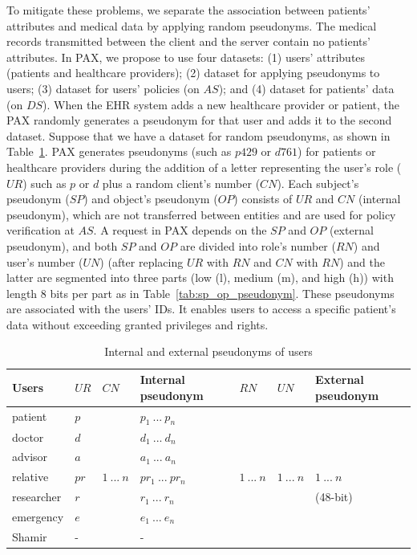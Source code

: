 \documentclass[journal,article,submit,moreauthors,pdftex]{Definitions/mdpi}
\begin{document}
\begin{itemize}
To mitigate these problems, we separate the association between patients' attributes and medical
data by applying random pseudonyms. The medical records transmitted between the client and the
server contain no patients' attributes. In PAX, we propose to use four datasets: (1) users' attributes (patients and healthcare providers); (2) dataset for applying pseudonyms to users;
(3) dataset for users' policies (on $AS$); and (4) dataset for patients' data (on $DS$).
When the EHR system adds a new healthcare provider or patient, the PAX randomly generates a
pseudonym for that user and adds it to the second dataset.
Suppose that we have a dataset for random pseudonyms, as shown in Table~\ref{tab:r_rn_un_pseudonym}. PAX generates pseudonyms (such as $p429$ or $d761$) for patients or healthcare providers
during the addition of a letter representing the user's role ($UR$) such as $p$ or $d$ plus a
random client's number ($CN$). Each subject's pseudonym ($SP$) and object's pseudonym ($OP$)
consists of $UR$ and $CN$ (internal pseudonym), which are not transferred between entities
and are used for policy verification at $AS$. A request in PAX depends on the $SP$ and $OP$
(external pseudonym), and both $SP$ and $OP$ are divided into role's number ($RN$) and
user's number ($UN$) (after replacing $UR$ with $RN$ and  $CN$ with $RN$) and the latter are segmented into three parts (low (l), medium (m), and high (h)) with length 8 bits per part as in Table~\ref{tab:sp_op_pseudonym}.
These pseudonyms are associated with the users' IDs. It enables users to access a specific patient's data without exceeding granted privileges and rights.

\begin{table}[ht]
\begin{center}
\caption{Internal and external pseudonyms of users}
\scriptsize
\setlength{\tabcolsep}{2pt}
\begin{tabular}{|p{37pt}|p{20pt}|p{20pt}||p{39pt}|p{20pt}|p{20pt}||p{39pt}|} \hline
Users	& $UR$  & $CN$ & Internal pseudonym  & $RN$ & $UN$ & External pseudonym   \\ \hline
patient & $p$   &      & $p_1\ ...\ p_n$     &      &      &                      \\ 			
doctor  & $d$   &      & $d_1\ ...\ d_n$     &      &      &                      \\			 advisor & $a$   &      & $a_1\ ...\ a_n$     &      &      &                      \\
relative& $pr$  &$1\ ...\ n$ &$pr_1\ ...\ pr_n$ &$1\ ...\ n$ &$1\ ...\ n$&$1\ ...\ n$ \ \ \  \\
researcher& $r$ &      &  $r_1\ ...\ r_n$    &      &     &   (48-bit)             \\
emergency & $e$ &      & $e_1\ ...\ e_n$     &      &     &                        \\
Shamir    & -   &      & -                   &      &     &                        \\ \hline
\end{tabular}
\label{tab:r_rn_un_pseudonym}
\end{center}
\end{table}


\end{itemize}
\end{document}

